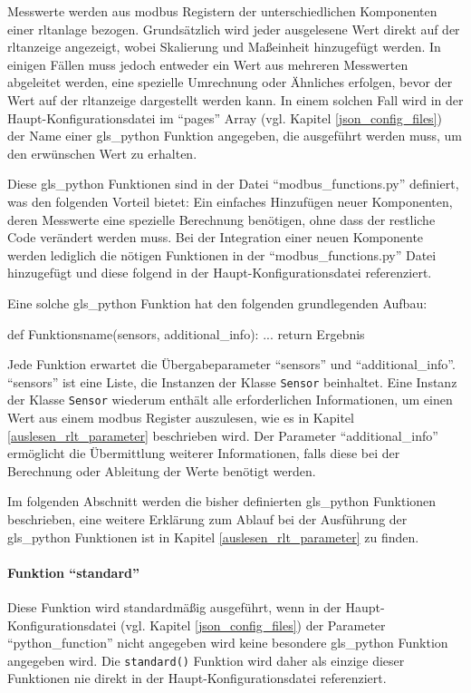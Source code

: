 \label{python_functions}
Messwerte werden aus \gls{modbus} Registern der unterschiedlichen Komponenten einer \acs{rltanlage} bezogen.  Grundsätzlich wird jeder ausgelesene Wert direkt auf der \acs{rltanzeige} angezeigt, wobei Skalierung und Maßeinheit hinzugefügt werden. In einigen Fällen muss jedoch entweder ein Wert aus mehreren Messwerten abgeleitet werden, eine spezielle Umrechnung oder Ähnliches erfolgen, bevor der Wert auf der \acs{rltanzeige} dargestellt werden kann. In einem solchen Fall wird in der Haupt-Konfigurationsdatei im \enquote{pages} Array (vgl. Kapitel \ref{json_config_files}) der Name einer \gls{gls_python} Funktion angegeben, die ausgeführt werden muss, um den erwünschen Wert zu erhalten. 

Diese \gls{gls_python} Funktionen sind in der Datei \enquote{modbus\_functions.py} definiert, was den folgenden Vorteil bietet: Ein einfaches Hinzufügen neuer Komponenten, deren Messwerte eine spezielle Berechnung benötigen, ohne dass der restliche Code verändert werden muss. Bei der Integration einer neuen Komponente werden lediglich die nötigen Funktionen in der \enquote{modbus\_functions.py} Datei hinzugefügt und diese folgend in der Haupt-Konfigurationsdatei referenziert.

Eine solche \gls{gls_python} Funktion hat den folgenden grundlegenden Aufbau:
\begin{pythoncode}
def Funktionsname(sensors, additional_info):
	...	
	return Ergebnis
\end{pythoncode}

Jede Funktion erwartet die Übergabeparameter \enquote{sensors} und \enquote{additional\_info}. \enquote{sensors} ist eine Liste, die Instanzen der Klasse \lstinline{Sensor} beinhaltet. Eine Instanz der Klasse \lstinline{Sensor} wiederum enthält alle erforderlichen Informationen, um einen Wert aus einem \gls{modbus} Register auszulesen, wie es in Kapitel \ref{auslesen_rlt_parameter} beschrieben wird. \newline 
Der Parameter \enquote{additional\_info} ermöglicht die Übermittlung weiterer Informationen, falls diese bei der Berechnung oder Ableitung der Werte benötigt werden.

Im folgenden Abschnitt werden die bisher definierten \gls{gls_python} Funktionen beschrieben, eine weitere Erklärung zum Ablauf bei der Ausführung der \gls{gls_python} Funktionen ist in Kapitel \ref{auslesen_rlt_parameter} zu finden.


\paragraph{Funktion \enquote{standard}}
Diese Funktion wird standardmäßig ausgeführt, wenn in der Haupt-Konfigurationsdatei (vgl. Kapitel \ref{json_config_files}) der Parameter \enquote{python\_function} nicht angegeben wird \bzw keine besondere \gls{gls_python} Funktion angegeben wird. Die \lstinline{standard()} Funktion wird daher als einzige dieser Funktionen nie direkt in der Haupt-Konfigurationsdatei referenziert.

